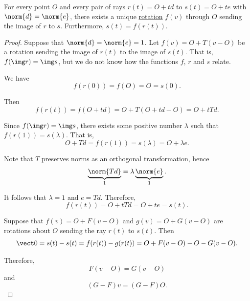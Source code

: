 \begin{proposition}\label{thm:plane_ray_rotation}
  For every point \( O \) and every pair of rays \( r(t) = O + td \) to \( s(t) = O + te \) with \( \norm{d} = \norm{e} \), there exists a unique \hyperref[def:rigid_motion/rotation]{rotation} \( f(v) \) through \( O \) sending the image of \( r \) to \( s \). Furthermore, \( s(t) = f(r(t)) \).
\end{proposition}
\begin{proof}
   Suppose that \( \norm{d} = \norm{e} = 1 \). Let \( f(v) = O + T(v - O) \) be a rotation sending the image of \( r(t) \) to the image of \( s(t) \). That is, \( f(\img r) = \img s \), but we do not know how the functions \( f \), \( r \) and \( s \) relate.

  We have
  \begin{equation*}
    f(r(0)) = f(O) = O = s(0).
  \end{equation*}

  Then
  \begin{equation*}
    f(r(t)) = f(O + td) = O + T(O + td - O) = O + t Td.
  \end{equation*}

  Since \( f(\img r) = \img s \), there exists some positive number \( \lambda \) such that \( f(r(1)) = s(\lambda) \). That is,
  \begin{equation*}
    O + Td = f(r(1)) = s(\lambda) = O + \lambda e.
  \end{equation*}

  Note that \( T \) preserves norms as an orthogonal transformation, hence
  \begin{equation*}
    \underbrace{\norm{Td}}_{1} = \lambda \underbrace{\norm{e}}_{1}.
  \end{equation*}

  It follows that \( \lambda = 1 \) and \( e = Td \). Therefore,
  \begin{equation*}
    f(r(t)) = O + t Td = O + te = s(t).
  \end{equation*}

  \UniquenessSubProof Suppose that \( f(v) = O + F(v - O) \) and \( g(v) = O + G(v - O) \) are rotations about \( O \) sending the ray \( r(t) \) to \( s(t) \). Then
  \begin{equation*}
    \vect 0 = s(t) - s(t) = f(r(t)) - g(r(t)) = O + F(v - O) - O - G(v - O).
  \end{equation*}

  Therefore,
  \begin{equation*}
    F(v - O) = G(v - O)
  \end{equation*}
  and
  \begin{equation*}
    (G - F) v = (G - F) O.
  \end{equation*}


\end{proof}
